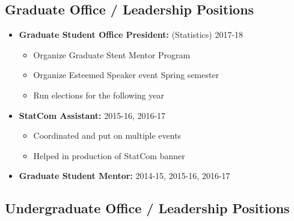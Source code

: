 \documentclass[oneside]{article}
\begin{document}
\subsection{Graduate Office / Leadership Positions}

\begin{itemize}
  \item{\bf Graduate Student Office President:} (Statistics) 2017-18
  \begin{itemize}
    \item Organize Graduate Stent Mentor Program
    \item Organize Esteemed Speaker event Spring semester
    \item Run elections for the following year
  \end{itemize}

  \item{\bf StatCom Assistant:} 2015-16, 2016-17
  \begin{itemize}
    \item Coordinated and put on multiple events
    \item Helped in production of StatCom banner
  \end{itemize}

  \item{\bf Graduate Student Mentor:} 2014-15, 2015-16, 2016-17
\end{itemize}

\subsection{Undergraduate Office / Leadership Positions}
\end{document}
